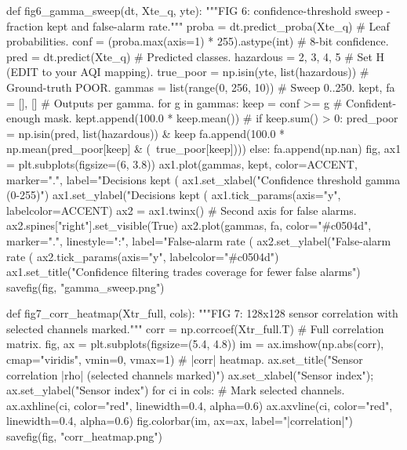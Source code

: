 def fig6_gamma_sweep(dt, Xte_q, yte):
    """FIG 6: confidence-threshold sweep - fraction kept and false-alarm rate."""
    proba = dt.predict_proba(Xte_q)                  # Leaf probabilities.
    conf = (proba.max(axis=1) * 255).astype(int)     # 8-bit confidence.
    pred = dt.predict(Xte_q)                         # Predicted classes.
    hazardous = {2, 3, 4, 5}                          # Set H (EDIT to your AQI mapping).
    true_poor = np.isin(yte, list(hazardous))        # Ground-truth POOR.
    gammas = list(range(0, 256, 10))                 # Sweep 0..250.
    kept, fa = [], []                                # Outputs per gamma.
    for g in gammas:
        keep = conf >= g                             # Confident-enough mask.
        kept.append(100.0 * keep.mean())             # %
        if keep.sum() > 0:
            pred_poor = np.isin(pred, list(hazardous)) & keep
            fa.append(100.0 * np.mean(pred_poor[keep] & (~true_poor[keep])))
        else:
            fa.append(np.nan)
    fig, ax1 = plt.subplots(figsize=(6, 3.8))
    ax1.plot(gammas, kept, color=ACCENT, marker=".", label="Decisions kept (%
    ax1.set_xlabel("Confidence threshold gamma (0-255)")
    ax1.set_ylabel("Decisions kept (%
    ax1.tick_params(axis="y", labelcolor=ACCENT)
    ax2 = ax1.twinx()                                # Second axis for false alarms.
    ax2.spines["right"].set_visible(True)
    ax2.plot(gammas, fa, color="#c0504d", marker=".", linestyle=":",
             label="False-alarm rate (%
    ax2.set_ylabel("False-alarm rate (%
    ax2.tick_params(axis="y", labelcolor="#c0504d")
    ax1.set_title("Confidence filtering trades coverage for fewer false alarms")
    savefig(fig, "gamma_sweep.png")

def fig7_corr_heatmap(Xtr_full, cols):
    """FIG 7: 128x128 sensor correlation with selected channels marked."""
    corr = np.corrcoef(Xtr_full.T)                   # Full correlation matrix.
    fig, ax = plt.subplots(figsize=(5.4, 4.8))
    im = ax.imshow(np.abs(corr), cmap="viridis", vmin=0, vmax=1)  # |corr| heatmap.
    ax.set_title("Sensor correlation |rho| (selected channels marked)")
    ax.set_xlabel("Sensor index"); ax.set_ylabel("Sensor index")
    for ci in cols:                                  # Mark selected channels.
        ax.axhline(ci, color="red", linewidth=0.4, alpha=0.6)
        ax.axvline(ci, color="red", linewidth=0.4, alpha=0.6)
    fig.colorbar(im, ax=ax, label="|correlation|")
    savefig(fig, "corr_heatmap.png")

